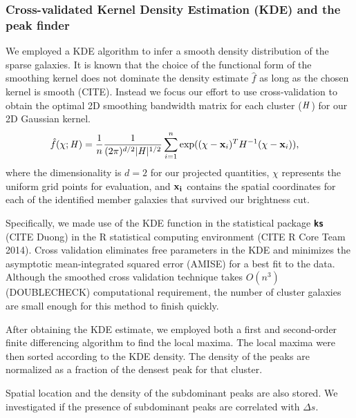 \subsubsection{Cross-validated Kernel Density Estimation (KDE) and the peak finder} 
\label{subsubsec:KDE}
We employed a KDE algorithm to infer a smooth density distribution of the
sparse galaxies.
It is known that the choice of the functional form of the smoothing kernel does
not dominate the density estimate $\hat{f}$ as long as the chosen kernel is
smooth (CITE). Instead we focus our effort to use cross-validation to obtain 
the optimal 2D smoothing
bandwidth matrix for each cluster ($\mathbf{\it H}$) for our 2D Gaussian kernel. 
\begin{align}
	\hat{f}(\chi; \mathbf{\it H}) &= \frac{1}{n} \frac{1}{(2\pi)^{d/2}|\mathbf{\it H}|^{1/2}}
	\sum_{i=1}^n \exp((\chi-{\bf x}_i)^T H^{-1} (\chi-{\bf x}_i)),
\end{align}
where the dimensionality is $d=2$ for our projected quantities,
$\chi$ represents the uniform grid points for evaluation, and 
$\bf{x}_i$ contains the spatial coordinates for each of the identified member 
galaxies that survived our brightness cut.

Specifically, we made use of the KDE function in
the statistical package {\bf \texttt{ks}} (CITE Duong) in the R statistical 
computing environment (CITE R Core Team 2014). 
Cross validation eliminates free parameters in the KDE and minimizes
the asymptotic mean-integrated squared error (AMISE) for a best fit to the
data. Although the smoothed cross validation technique takes $O(n^3)$
(DOUBLECHECK) computational requirement, the number of cluster galaxies are
small enough for this method to finish quickly. 

After obtaining the KDE estimate, we employed both a first and second-order  
finite differencing algorithm to find the local maxima.  
The local maxima were then sorted according to the KDE density. The density
of the peaks are normalized as a fraction of the densest peak for that 
cluster. 



Spatial location and the density of the subdominant peaks are also stored.
We investigated if the presence of subdominant peaks are correlated with
$\Delta s$. 

